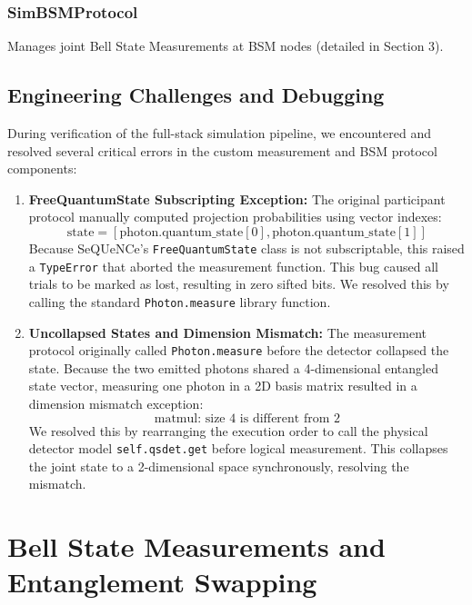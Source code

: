 \documentclass[12pt,oneside,letterpaper,english]{article}
\begin{document}
\subsubsection{SimBSMProtocol}
Manages joint Bell State Measurements at BSM nodes (detailed in Section 3).

\subsection{Engineering Challenges and Debugging}

During verification of the full-stack simulation pipeline, we encountered and resolved several critical errors in the custom measurement and BSM protocol components:
\begin{enumerate}
    \item \textbf{FreeQuantumState Subscripting Exception:} The original participant protocol manually computed projection probabilities using vector indexes:
    \begin{equation*}
        \text{state} = [\text{photon.quantum\_state}[0], \text{photon.quantum\_state}[1]]
    \end{equation*}
    Because SeQUeNCe's \texttt{FreeQuantumState} class is not subscriptable, this raised a \texttt{TypeError} that aborted the measurement function. This bug caused all trials to be marked as lost, resulting in zero sifted bits. We resolved this by calling the standard \texttt{Photon.measure} library function.
    
    \item \textbf{Uncollapsed States and Dimension Mismatch:} The measurement protocol originally called \texttt{Photon.measure} before the detector collapsed the state. Because the two emitted photons shared a 4-dimensional entangled state vector, measuring one photon in a 2D basis matrix resulted in a dimension mismatch exception:
    \begin{equation*}
        \text{matmul: size 4 is different from 2}
    \end{equation*}
    We resolved this by rearranging the execution order to call the physical detector model \texttt{self.qsdet.get} before logical measurement. This collapses the joint state to a 2-dimensional space synchronously, resolving the mismatch.
\end{enumerate}

\section{Bell State Measurements and Entanglement Swapping}
\end{document}
